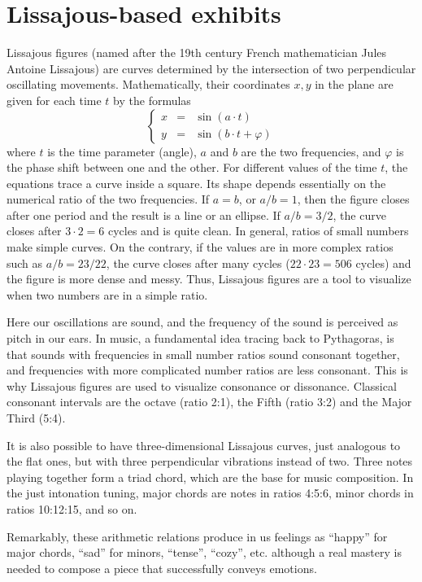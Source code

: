 \section{Lissajous-based exhibits}
Lissajous figures (named after the 19th century French mathematician Jules Antoine Lissajous) are curves determined by the intersection of two perpendicular oscillating movements. Mathematically, their coordinates $x,y$ in the plane are given for each time $t$ by the formulas
$$\left\{ \begin{array}{rcl}
x &=& \sin(a\cdot t) \\
y &=& \sin(b\cdot t + \varphi)
\end{array} \right. $$
where $t$ is the time parameter (angle),  $a$ and $b$ are the two frequencies, and $\varphi$ is the phase shift between one and the other. For different values of the time $t$, the equations trace a curve inside a square. Its shape depends essentially on the numerical ratio of the two frequencies. If $a=b$, or $a/b=1$, then the figure closes after one period and the result is a line or an ellipse. If $a/b = 3/2$, the curve closes after $3\cdot 2=6$ cycles and is quite clean. In general, ratios of small numbers make simple curves. On the contrary, if the values are in more complex ratios such as $a/b = 23/22$, the curve closes after many cycles ($22\cdot 23=506$ cycles) and the figure is more dense and messy. Thus, Lissajous figures are a tool to visualize when two numbers are in a simple ratio.

Here our oscillations are sound, and the frequency of the sound is perceived as pitch in our ears. In music, a fundamental idea tracing back to Pythagoras, is that sounds with frequencies in small number ratios sound consonant together, and frequencies with more complicated number ratios are less consonant. This is why Lissajous figures are used to visualize consonance or dissonance. Classical consonant intervals are the octave (ratio 2:1), the Fifth (ratio 3:2) and the Major Third (5:4).

It is also possible to have three-dimensional Lissajous curves, just analogous to the flat ones, but with three perpendicular vibrations instead of two. Three notes playing together form a triad chord, which are the base for music composition. In the just intonation tuning, major chords are notes in ratios 4:5:6, minor chords in ratios 10:12:15, and so on.

Remarkably, these arithmetic relations produce in us feelings as ``happy'' for major chords, ``sad'' for minors,
``tense'', ``cozy'', etc. although a real mastery is needed to compose a piece that successfully conveys emotions.

